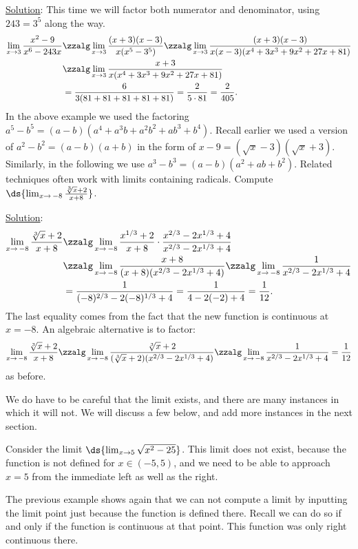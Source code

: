 \underline{Solution}: This time we will factor both
numerator and denominator, using $243=3^5$ along the way.
\begin{align*}\lim_{x\to3}\frac{x^2-9}{x^6-243x}
&\zzalg
\lim_{x\to3}\frac{(x+3)(x-3)}{x(x^5-3^5)}
\zzalg
\lim_{x\to3}\frac{(x+3)(x-3)}{x(x-3)(x^4+3x^3+9x^2+27x+81)}\\
&\zzalg
\lim_{x\to3}\frac{x+3}{x(x^4+3x^3+9x^2+27x+81)}\\
&=\frac{6}{3(81+81+81+81+81)}
=\frac{2}{5\cdot81}
=\frac2{405}.
\end{align*}
\eex
In the above example we used the factoring
$a^5-b^5=(a-b)(a^4+a^3b+a^2b^2+ab^3+b^4)$.
Recall earlier we used a version of $a^2-b^2=(a-b)(a+b)$
in the form of $x-9=(\sqrt{x}-3)(\sqrt{x}+3)$.
Similarly, in the following we use 
$a^3-b^3=(a-b)(a^2+ab+b^2)$.
Related techniques often work with limits containing radicals.
\bex Compute $\ds{\lim_{x\to\,-8}\frac{\sqrt[3]x+2}{x+8}}$.

\underline{Solution}:
\begin{align*}
\lim_{x\to\,-8}\frac{\sqrt[3]x+2}{x+8}
&\zzalg
\lim_{x\to\,-8}\frac{x^{1/3}+2}{x+8}\cdot
  \frac{x^{2/3}-2x^{1/3}+4}{x^{2/3}-2x^{1/3}+4}\\
&\zzalg
\lim_{x\to\,-8}\frac{x+8}{(x+8)(x^{2/3}-2x^{1/3}+4)}
\zzalg
\lim_{x\to\,-8}\frac1{x^{2/3}-2x^{1/3}+4}\\
&=\frac1{(-8)^{2/3}-2(-8)^{1/3}+4}=\frac1{4-2(-2)+4}=\frac1{12}.
\end{align*}
The last equality comes from the fact that the new
function is continuous at $x=-8$.
An algebraic alternative is to factor:
$$\lim_{x\to\,-8}\frac{\sqrt[3]x+2}{x+8}
\zzalg
\lim_{x\to\,-8}\frac{\sqrt[3]x+2}{(\sqrt[3]x+2)(x^{2/3}-2x^{1/3}+4)}
\zzalg
\lim_{x\to\,-8}\frac1{x^{2/3}-2x^{1/3}+4}=\frac1{12}  $$
as before.
\eex

We do have to be careful that the limit exists, and there
are many instances in which it will not.  We will discuss
a few below, and add more instances in the next section.

\bex Consider the limit $\ds{\lim_{x\to5}\sqrt{x^2-25}}$.
This limit does not exist, because the function is
not defined for $x\in(-5,5)$, and we need to be able to
approach $x=5$ from the immediate left as well as the right.
\eex

The previous example shows again that we can not compute a limit
by  inputting the limit point just because the function
is defined there.  Recall we can do so if and only if
the function is continuous at that point.  This function
was only right continuous there.

